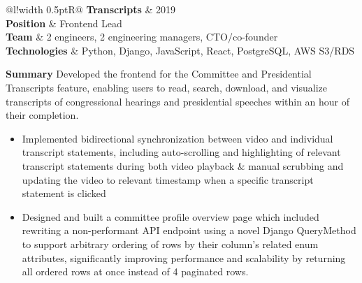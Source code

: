 \documentclass[]{article}
\newcommand\VRule{\color{lightgray}\vrule width 0.5pt}
\begin{document}

\begin{tabular}{@{}l!{\VRule}R@{}}
	{\bf Transcripts} & {\footnotesize 2019}\\
	\textbf{Position} & Frontend Lead\\
	\textbf{Team} & 2 engineers, 2 engineering managers, CTO/co-founder\\
	\textbf{Technologies} & Python, Django, JavaScript, React, PostgreSQL, AWS S3/RDS\\
\end{tabular}

\textbf{Summary}
Developed the frontend for the Committee and Presidential Transcripts feature, enabling users to read, search, download, and visualize transcripts of congressional hearings and presidential speeches within an hour of their completion.

\begin{itemize}
	\item Implemented bidirectional synchronization between video and individual transcript statements, including auto-scrolling and highlighting of relevant transcript statements during both video playback \& manual scrubbing and updating the video to relevant timestamp when a specific transcript statement is clicked
	\item Designed and built a committee profile overview page which included rewriting a non-performant API endpoint using a novel Django QueryMethod to support arbitrary ordering of rows by their column's related enum attributes, significantly improving performance and scalability by returning all ordered rows at once instead of 4 paginated rows.\\
\end{itemize}
\end{document}
